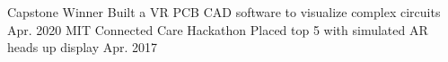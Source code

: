 
\begin{cvhonors}

  \cvhonor
    {Capstone Winner} %
    {Built a VR PCB CAD software to visualize complex circuits} %
    {Apr. 2020} %
  \cvhonor
    {MIT Connected Care Hackathon} %
    {Placed top 5 with simulated AR heads up display } %
    {Apr. 2017} %
    
%
\end{cvhonors}